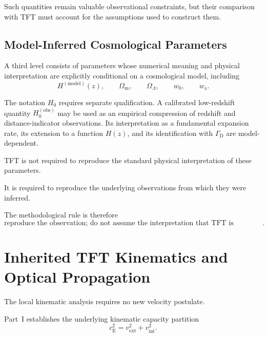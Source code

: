 Such quantities remain valuable observational constraints, but their
comparison with TFT must account for the assumptions used to construct them.

\subsection{Model-Inferred Cosmological Parameters}

A third level consists of parameters whose numerical meaning and physical
interpretation are explicitly conditional on a cosmological model, including
\begin{equation}
    H^{(\mathrm{model})}(z),
    \qquad
    \Omega_{\mathrm m},
    \qquad
    \Omega_\Lambda,
    \qquad
    w_0,
    \qquad
    w_{\mathrm a}.
\end{equation}

The notation \(H_0\) requires separate qualification. A calibrated
low-redshift quantity \(H_0^{(\mathrm{obs})}\) may be used as an empirical
compression of redshift and distance-indicator observations. Its
interpretation as a fundamental expansion rate, its extension to a function
\(H(z)\), and its identification with \(\Gamma_{\mathrm D}\) are
model-dependent.

TFT is not required to reproduce the standard physical interpretation of
these parameters.

It is required to reproduce the underlying observations from which they were
inferred.

The methodological rule is therefore
\begin{equation}
    \boxed{
    \text{reproduce the observation;
    do not assume the interpretation that TFT is intended to test}.
    }
    \label{eq:AR_observation_rule}
\end{equation}


\section{Inherited TFT Kinematics and Optical Propagation}

The local kinematic analysis requires no new velocity postulate.

Part~I establishes the underlying kinematic capacity partition
\begin{equation}
    \boxed{
    c_{\mathrm E}^{2}
    =
    v_{\mathrm{ext}}^{2}
    +
    v_{\mathrm{int}}^{2}.
    }
    \label{eq:AR_velocity_budget}
\end{equation}

